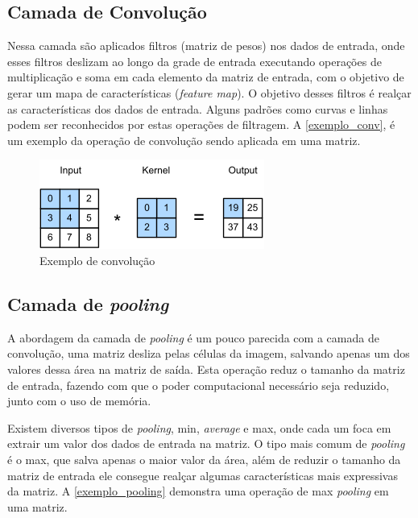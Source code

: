 \subsection{Camada de Convolução}\label{cap_conceitos_cnn_conv}
Nessa camada são aplicados filtros (matriz de pesos) nos dados de entrada, onde esses filtros deslizam ao longo da grade de
entrada executando operações de multiplicação e soma em cada elemento da matriz de entrada, com o objetivo de gerar um mapa de
características (\textit{feature map}).
O objetivo desses filtros é realçar as características dos dados de entrada. Alguns padrões como curvas e linhas podem ser
reconhecidos por estas operações de filtragem.
A \autoref{exemplo_conv}, é um exemplo da operação de convolução sendo aplicada em uma matriz.

\begin{figure}[htb]
	\caption {\label{exemplo_conv} Exemplo de convolução}
	\begin{center}
		\includegraphics[scale=1.0]{Imagens/conv}
	\end{center}
\end{figure}

\subsection{Camada de \textit{pooling}}\label{cap_conceitos_cnn_pooling}
A abordagem da camada de \textit{pooling} é um pouco parecida com a camada de convolução,
uma matriz desliza pelas células da imagem, salvando apenas um dos valores dessa área na matriz de saída.
Esta operação reduz o tamanho da matriz de entrada, fazendo com que o poder computacional necessário seja reduzido,
junto com o uso de memória.

Existem diversos tipos de \textit{pooling}, min, \textit{average} e max, onde cada um foca em extrair um valor dos
dados de entrada na matriz. O tipo mais comum de \textit{pooling} é o max, que salva apenas o maior valor da área,
além de reduzir o tamanho da matriz de entrada ele consegue realçar algumas características mais expressivas da matriz.
A \autoref{exemplo_pooling} demonstra uma operação de max \textit{pooling} em uma matriz.

